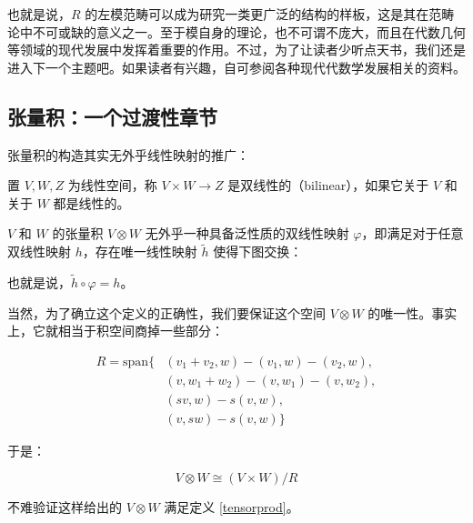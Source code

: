 也就是说，$R$ 的左模范畴可以成为研究一类更广泛的结构的样板，这是其在范畴论中不可或缺的意义之一。至于模自身的理论，也不可谓不庞大，而且在代数几何等领域的现代发展中发挥着重要的作用。不过，为了让读者少听点天书，我们还是进入下一个主题吧。如果读者有兴趣，自可参阅各种现代代数学发展相关的资料。

\subsection{张量积：一个过渡性章节}

张量积的构造其实无外乎线性映射的推广：

\begin{definition}
    置 $V, W, Z$ 为线性空间，称 $V \times W \to Z$ 是双线性的（bilinear），如果它关于 $V$ 和关于 $W$ 都是线性的。
\end{definition}

\begin{definition} \label{tensorprod}
    $V$ 和 $W$ 的张量积 $V \otimes W$ 无外乎一种具备泛性质的双线性映射 $\varphi$，即满足对于任意双线性映射 $h$，存在唯一线性映射 $\tilde h$ 使得下图交换：
    
    \begin{center}
    \end{center}

    也就是说，$\tilde h \circ \varphi = h$。
\end{definition}

当然，为了确立这个定义的正确性，我们要保证这个空间 $V \otimes W$ 的唯一性。事实上，它就相当于积空间商掉一些部分：

\begin{align*}
    R = \mathrm{span}\{&(v_1 + v_2, w) - (v_1, w) - (v_2, w), \\
    & (v, w_1 + w_2) - (v, w_1) - (v, w_2), \\
    & (sv, w) - s(v, w), \\
    & (v, sw) - s(v, w)\}
\end{align*}

于是：

\[
V \otimes W \cong (V \times W) / R
\]

不难验证这样给出的 $V \otimes W$ 满足定义 \ref{tensorprod}。



